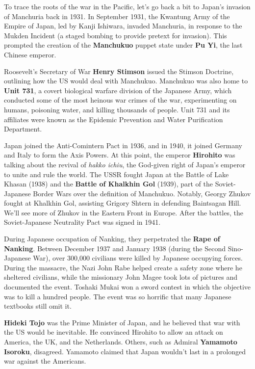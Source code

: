 To trace the roots of the war in the Pacific,
let's go back a bit to Japan's invasion of Manchuria back in 1931.
In September 1931,
the Kwantung Army of the Empire of Japan, led by Kanji Ishiwara, invaded Manchuria,
in response to the Mukden Incident (a staged bombing to provide pretext for invasion).
This prompted the creation of the \textbf{Manchukuo} puppet state under \textbf{Pu Yi},
the last Chinese emperor.

Roosevelt's Secretary of War \textbf{Henry Stimson} issued the Stimson Doctrine,
outlining how the US would deal with Manchukuo.
Manchukuo was also home to \textbf{Unit 731},
a covert biological warfare division of the Japanese Army,
which conducted some of the most heinous war crimes of the war,
experimenting on humans, poisoning water, and killing thousands of people.
Unit 731 and its affiliates were known as the Epidemic Prevention and Water Purification Department.

Japan joined the Anti-Comintern Pact in 1936, and in 1940,
it joined Germany and Italy to form the Axis Powers.
At this point, the emperor \textbf{Hirohito} was talking about the revival of \textit{hakko ichiu},
the God-given right of Japan's emperor to unite and rule the world.
The USSR fought Japan at the Battle of Lake Khasan (1938)
and the \textbf{Battle of Khalkhin Gol} (1939),
part of the Soviet-Japanese Border Wars over the definition of Manchukuo.
Notably, Georgy Zhukov fought at Khalkhin Gol,
assisting Grigory Shtern in defending Baintsagan Hill.
We'll see more of Zhukov in the Eastern Front in Europe.
After the battles, the Soviet-Japanese Neutrality Pact was signed in 1941.

During Japanese occupation of Nanking, they perpetrated the \textbf{Rape of Nanking}.
Between December 1937 and January 1938 (during the Second Sino-Japanese War),
over 300,000 civilians were killed by Japanese occupying forces.
During the massacre, the Nazi John Rabe helped create a safety zone where he sheltered civilians,
while the missionary John Magee took lots of pictures and documented the event.
Toshaki Mukai won a sword contest in which the objective was to kill a hundred people.
The event was so horrific that many Japanese textbooks still omit it.

\textbf{Hideki Tojo} was the Prime Minister of Japan,
and he believed that war with the US would be inevitable.
He convinced Hirohito to allow an attack on America, the UK, and the Netherlands.
Others, such as Admiral \textbf{Yamamoto Isoroku}, disagreed.
Yamamoto claimed that Japan wouldn't last in a prolonged war against the Americans.


